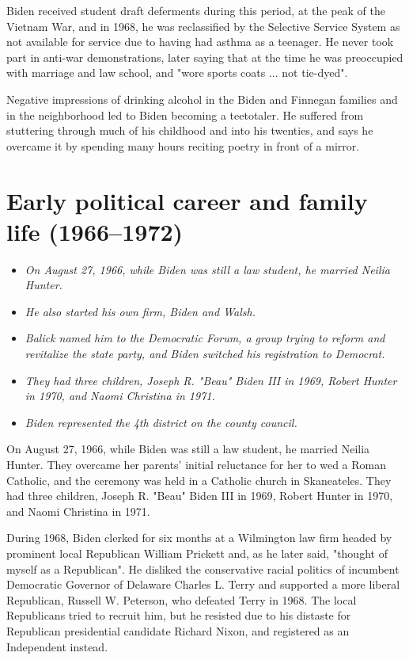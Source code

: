 Biden received student draft deferments during this period, at the peak
of the Vietnam War, and in 1968, he was reclassified by the Selective
Service System as not available for service due to having had asthma as
a teenager. He never took part in anti-war demonstrations, later saying
that at the time he was preoccupied with marriage and law school, and
"wore sports coats ... not tie-dyed".

Negative impressions of drinking alcohol in the Biden and Finnegan
families and in the neighborhood led to Biden becoming a teetotaler. He
suffered from stuttering through much of his childhood and into his
twenties, and says he overcame it by spending many hours reciting poetry
in front of a mirror.

\section{Early political career and family life
(1966--1972)}\label{early-political-career-and-family-life-19661972}

\begin{itemize}
\item
  \emph{On August 27, 1966, while Biden was still a law student, he
  married Neilia Hunter.}
\item
  \emph{He also started his own firm, Biden and Walsh.}
\item
  \emph{Balick named him to the Democratic Forum, a group trying to
  reform and revitalize the state party, and Biden switched his
  registration to Democrat.}
\item
  \emph{They had three children, Joseph R. "Beau" Biden III in 1969,
  Robert Hunter in 1970, and Naomi Christina in 1971.}
\item
  \emph{Biden represented the 4th district on the county council.}
\end{itemize}

On August 27, 1966, while Biden was still a law student, he married
Neilia Hunter. They overcame her parents' initial reluctance for her to
wed a Roman Catholic, and the ceremony was held in a Catholic church in
Skaneateles. They had three children, Joseph R. "Beau" Biden III in
1969, Robert Hunter in 1970, and Naomi Christina in 1971.

During 1968, Biden clerked for six months at a Wilmington law firm
headed by prominent local Republican William Prickett and, as he later
said, "thought of myself as a Republican". He disliked the conservative
racial politics of incumbent Democratic Governor of Delaware Charles L.
Terry and supported a more liberal Republican, Russell W. Peterson, who
defeated Terry in 1968. The local Republicans tried to recruit him, but
he resisted due to his distaste for Republican presidential candidate
Richard Nixon, and registered as an Independent instead.

